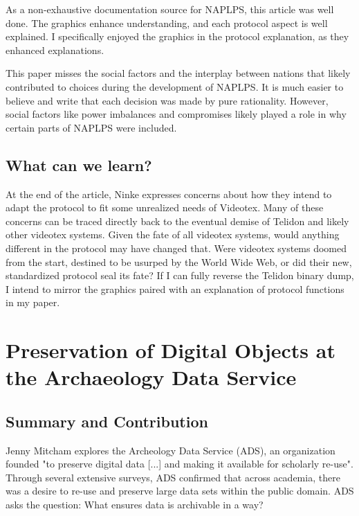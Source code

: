 \documentclass[sigconf]{acmart}
\begin{document}
As a non-exhaustive documentation source for NAPLPS, this article was well done. The graphics enhance understanding, and each protocol aspect is well explained. I specifically enjoyed the graphics in the protocol explanation, as they enhanced explanations.

This paper misses the social factors and the interplay between nations that likely contributed to choices during the development of NAPLPS. It is much easier to believe and write that each decision was made by pure rationality. However, social factors like power imbalances and compromises likely played a role in why certain parts of NAPLPS were included. 

\subsection{What can we learn?}

At the end of the article, Ninke expresses concerns about how they intend to adapt the protocol to fit some unrealized needs of Videotex. Many of these concerns can be traced directly back to the eventual demise of Telidon and likely other videotex systems. Given the fate of all videotex systems, would anything different in the protocol may have changed that. Were videotex systems doomed from the start, destined to be usurped by the World Wide Web, or did their new, standardized protocol seal its fate? If I can fully reverse the Telidon binary dump, I intend to mirror the graphics paired with an explanation of protocol functions in my paper. 

\section{Preservation of Digital Objects at the Archaeology Data Service}


\subsection{Summary and Contribution}

Jenny Mitcham explores the Archeology Data Service (ADS), an organization founded "to preserve digital data [...] and making it available for scholarly re-use". Through several extensive surveys, ADS confirmed that across academia, there was a desire to re-use and preserve large data sets within the public domain. ADS asks the question: What ensures data is archivable in a way?
\end{document}
